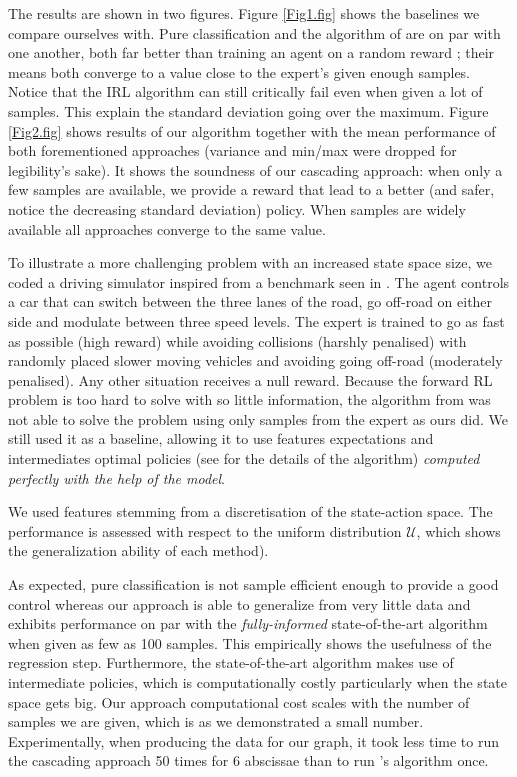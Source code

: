 \documentclass[11pt]{article}
\newcommand{\0}{\mathbf{0}}
\newcommand{\1}{\mathbf{1}}
\begin{document}
The results are shown in two figures. Figure \ref{Fig1.fig} shows the baselines we compare ourselves with. Pure classification and the algorithm of \cite{abbeel2004apprenticeship} are on par with one another, both far better than training an agent on a random reward ; their means both converge to a value close to the expert's given enough samples. Notice that the IRL algorithm can still critically fail even when given a lot of samples. This explain the standard deviation going over the maximum. Figure \ref{Fig2.fig} shows results of our algorithm together with the mean performance of both forementioned approaches (variance and min/max were dropped for legibility's sake). It shows the soundness of our cascading approach: when only a few samples are available, we provide a reward that lead to a better (and safer, notice the decreasing standard deviation) policy. When samples are widely available all approaches converge to the same value.

To illustrate a more challenging problem with an increased state space size, we coded a driving simulator inspired from a benchmark seen in \cite{syed2008apprenticeship,syed2008game}. The agent controls a car that can switch between the three lanes of the road, go off-road on either side and modulate between three speed levels. The expert is trained to go as fast as possible (high reward) while avoiding collisions (harshly penalised) with randomly placed slower moving vehicles and avoiding going off-road (moderately penalised). Any other situation receives a null reward. Because the forward RL problem is too hard to solve with so little information, the algorithm from \cite{abbeel2004apprenticeship} was not able to solve the problem using only samples from the expert as ours did. We still used it as a baseline, allowing it to use features expectations and intermediates optimal policies (see \cite{abbeel2004apprenticeship} for the details of the algorithm) \emph{computed perfectly with the help of the model}.

We used features stemming from a discretisation of the state-action space. The performance is assessed with respect to the uniform distribution $\mathcal{U}$, which shows the generalization ability of each method).

As expected, pure classification is not sample efficient enough to provide a good control whereas our approach is able to generalize from very little data and exhibits performance on par with the \emph{fully-informed} state-of-the-art algorithm when given as few as 100 samples. This empirically shows the usefulness of the regression step. Furthermore, the state-of-the-art algorithm makes use of intermediate policies, which is computationally costly particularly when the state space gets big. Our approach computational cost scales with the number of samples we are given, which is as we demonstrated a small number. Experimentally, when producing the data for our graph, it took less time to run the cascading approach 50 times for 6 abscissae than to run \cite{abbeel2004apprenticeship}'s algorithm once.
\end{document}
